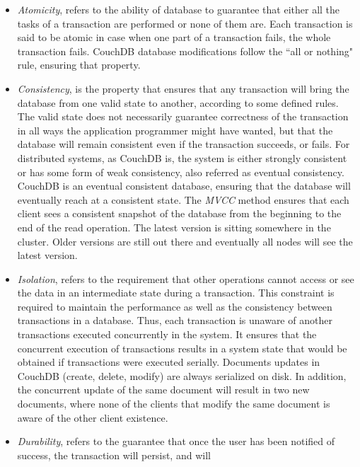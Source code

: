 \begin{description}
    \begin{itemize}
      \item \emph{Atomicity}, refers to the ability of database to guarantee
      that either all the tasks of a transaction are performed or none of them
      are. Each transaction is said to be atomic in case when one part of a
      transaction fails, the whole transaction fails. CouchDB database
      modifications follow the ``all or nothing" rule, ensuring that property.
      \item \emph{Consistency}, is the property that ensures that any
      transaction will bring the database from one valid state to another,
      according to some defined rules. The valid state does not necessarily
      guarantee correctness of the transaction in all ways the application
      programmer might have wanted, but that the database will remain consistent
      even if the transaction succeeds, or fails. For distributed systems, as
      CouchDB is, the system is either strongly consistent or has some form of
      weak consistency, also referred as eventual consistency. CouchDB is an
      eventual consistent database, ensuring that the database will eventually
      reach at a consistent state. The \emph{MVCC} method ensures that each
      client sees a consistent snapshot of the database from the beginning to
      the end of the read operation. The latest version is sitting somewhere in
      the cluster. Older versions are still out there and eventually all nodes
      will see the latest version.
      \item \emph{Isolation}, refers to the requirement that other operations
      cannot access or see the data in an intermediate state during a
      transaction. This constraint is required to maintain the performance as
      well as the consistency between transactions in a database. Thus, each
      transaction is unaware of another transactions executed concurrently in
      the system. It ensures that the concurrent execution of transactions
      results in a system state that would be obtained if transactions were
      executed serially. Documents updates in CouchDB (create, delete, modify)
      are always serialized on disk. In addition, the concurrent update of the
      same document will result in two new documents, where none of the clients
      that modify the same document is aware of the other client existence.
      \item \emph{Durability}, refers to the guarantee that once the user has
      been notified of success, the transaction will persist, and will

\end{itemize}
\end{description}
